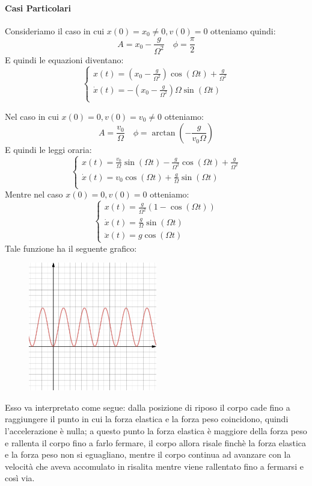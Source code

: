 \documentclass{article}
\begin{document}
\paragraph{Casi Particolari}
Consideriamo il caso in cui $x(0)=x_0\neq0,v(0)=0$ otteniamo quindi:
\[A=x_0-\frac{g}{\Omega^2}\quad \phi=\frac{\pi}{2}\]
E quindi le equazioni diventano:
\[\left\{\begin{array}{l}
    x(t)=\left(x_0-\frac{g}{\Omega^2}\right)\cos(\Omega t)+\frac{g}{\Omega^2} \\
    \Dot{x}(t)=-\left(x_0-\frac{g}{\Omega^2}\right)\Omega\sin(\Omega t)  \\
\end{array}\right.\]

Nel caso in cui $x(0)=0,v(0)=v_0\neq0$ otteniamo:
\[A=\frac{v_0}{\Omega}\quad\phi=\arctan\left(-\frac{g}{v_0\Omega}\right)\]
E quindi le leggi oraria:
\[\left\{\begin{array}{l}
    x(t)=\frac{v_0}{\Omega}\sin(\Omega t)-\frac{g}{\Omega^2}\cos(\Omega t)+\frac{g}{\Omega^2} \\
    \Dot{x}(t)=v_0\cos(\Omega t)+\frac{g}{\Omega}\sin(\Omega t)  \\
\end{array}\right.\]
Mentre nel caso $x(0)=0,v(0)=0$ otteniamo:
\[\left\{\begin{array}{l}
    x(t)=\frac{g}{\Omega^2}\left(1-\cos(\Omega t)\right) \\
    \Dot{x}(t)=\frac{g}{\Omega}\sin(\Omega t)  \\
    \ddot{x}(t)=g\cos(\Omega t)
\end{array}\right.\]
Tale funzione ha il seguente grafico:
\begin{figure}[H]
    \centering
    \includegraphics[width=0.5\textwidth]{Immagini/Appunti/desmos-graph.png}
    \label{grafomollaconpeso}
\end{figure}
Esso va interpretato come segue: dalla posizione di riposo il corpo cade fino a raggiungere il punto in cui la forza elastica e la forza peso coincidono, quindi l'accelerazione è nulla; a questo punto la forza elastica è maggiore della forza peso e rallenta il corpo fino a farlo fermare, il corpo allora risale finchè la forza elastica e la forza peso non si eguagliano, mentre il corpo continua ad avanzare con la velocità che aveva accomulato in risalita mentre viene rallentato fino a fermarsi e così via.
\end{document}
